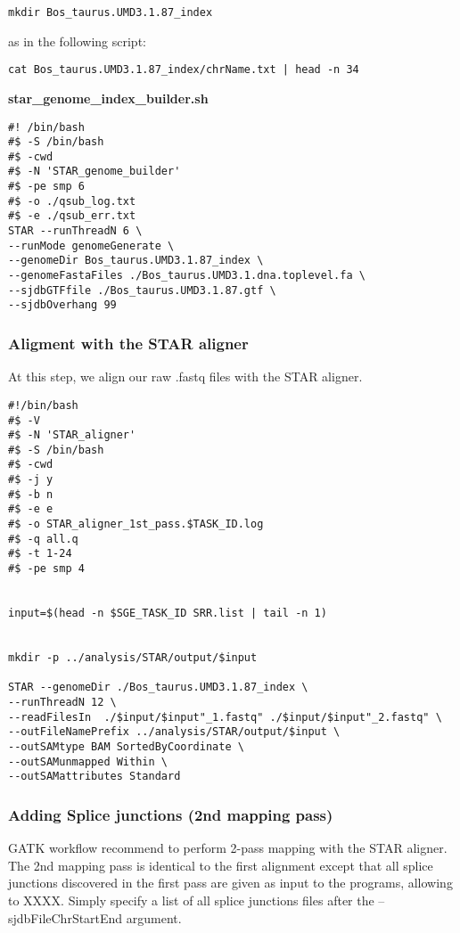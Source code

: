 \begin{verbatim}
mkdir Bos_taurus.UMD3.1.87_index
\end{verbatim}

 as in the following script:

\begin{verbatim}
cat Bos_taurus.UMD3.1.87_index/chrName.txt | head -n 34
\end{verbatim}

\textbf{star\_genome\_index\_builder.sh}
\begin{verbatim}
#! /bin/bash
#$ -S /bin/bash
#$ -cwd
#$ -N 'STAR_genome_builder'
#$ -pe smp 6
#$ -o ./qsub_log.txt
#$ -e ./qsub_err.txt
STAR --runThreadN 6 \
--runMode genomeGenerate \
--genomeDir Bos_taurus.UMD3.1.87_index \
--genomeFastaFiles ./Bos_taurus.UMD3.1.dna.toplevel.fa \
--sjdbGTFfile ./Bos_taurus.UMD3.1.87.gtf \
--sjdbOverhang 99
\end{verbatim}






\subsubsection{Aligment with the STAR aligner}

At this step, we align our raw .fastq files with the STAR aligner.

\begin{verbatim}
#!/bin/bash
#$ -V
#$ -N 'STAR_aligner'
#$ -S /bin/bash
#$ -cwd
#$ -j y
#$ -b n
#$ -e e
#$ -o STAR_aligner_1st_pass.$TASK_ID.log
#$ -q all.q
#$ -t 1-24
#$ -pe smp 4


input=$(head -n $SGE_TASK_ID SRR.list | tail -n 1)


mkdir -p ../analysis/STAR/output/$input

STAR --genomeDir ./Bos_taurus.UMD3.1.87_index \
--runThreadN 12 \
--readFilesIn  ./$input/$input"_1.fastq" ./$input/$input"_2.fastq" \
--outFileNamePrefix ../analysis/STAR/output/$input \
--outSAMtype BAM SortedByCoordinate \
--outSAMunmapped Within \
--outSAMattributes Standard
\end{verbatim}



\subsubsection{Adding Splice junctions (2nd mapping pass)}

GATK workflow recommend to perform 2-pass mapping with the STAR aligner. The 2nd mapping pass is identical to the first alignment except that all splice junctions discovered in the first pass are given as input to the programs, allowing to XXXX. Simply specify a list of all splice junctions files after the --sjdbFileChrStartEnd argument.


